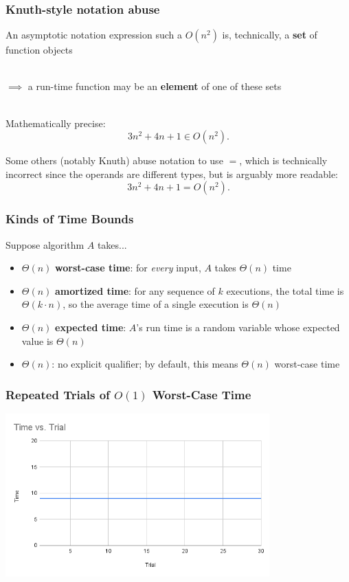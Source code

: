 \documentclass{beamer}
\newcommand{\stanza}{ \\~\ }
\begin{document}
\begin{frame} \frametitle{Knuth-style notation abuse}

  An asymptotic notation expression such a $O(n^2)$ is, technically, a
  \textbf{set} of function objects \stanza

  $\implies$ a run-time function may be an \textbf{element} of one of these sets \stanza

  Mathematically precise: \[ 3n^2+4n+1 \in O(n^2). \]

  Some others (notably Knuth) abuse notation to use $=$, which is technically incorrect
  since the operands are different types, but is arguably more readable:
  \[ 3n^2 + 4n +1 = O(n^2) .\]

\end{frame}

\begin{frame} \frametitle{Kinds of Time Bounds}
  Suppose algorithm $A$ takes...
  \begin{itemize}
    \item $\Theta(n)$ \textbf{worst-case time}: for \emph{every} input, $A$ takes $\Theta(n)$ time
    \item $\Theta(n)$ \textbf{amortized time}: for any sequence of $k$ executions, the total time is $\Theta(k \cdot n)$, so the average time of a single execution is $\Theta(n)$
    \item $\Theta(n)$ \textbf{expected time}: $A$'s run time is a random variable whose expected value is $\Theta(n)$ 
    \item $\Theta(n)$: no explicit qualifier; by default, this means $\Theta(n)$ worst-case time
  \end{itemize}
\end{frame}

\begin{frame} \frametitle{Repeated Trials of $O(1)$ Worst-Case Time}
  \includegraphics[width=4in]{LineGraphWorstCase.png}
\end{frame}
\end{document}
